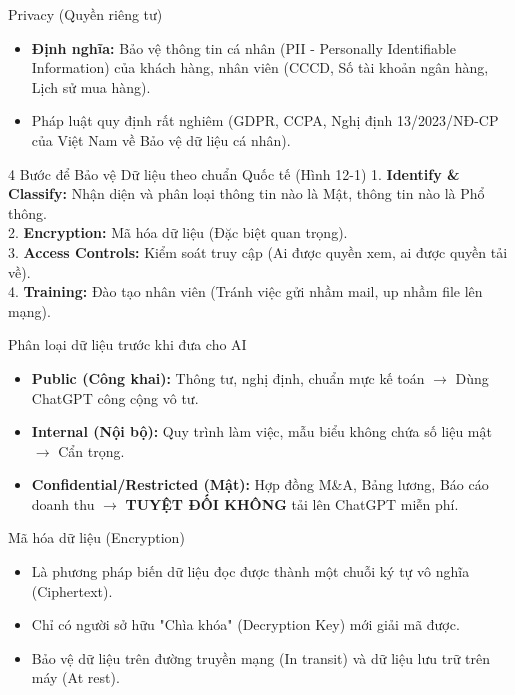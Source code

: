 \documentclass[aspectratio=169]{beamer}
\begin{document}
\begin{frame}{Privacy (Quyền riêng tư)}
    \begin{itemize}
        \item \textbf{Định nghĩa:} Bảo vệ thông tin cá nhân (PII - Personally Identifiable Information) của khách hàng, nhân viên (CCCD, Số tài khoản ngân hàng, Lịch sử mua hàng).
        \item Pháp luật quy định rất nghiêm (GDPR, CCPA, Nghị định 13/2023/NĐ-CP của Việt Nam về Bảo vệ dữ liệu cá nhân).
    \end{itemize}
\end{frame}


\begin{frame}{4 Bước để Bảo vệ Dữ liệu theo chuẩn Quốc tế (Hình 12-1)}
    1. \textbf{Identify \& Classify:} Nhận diện và phân loại thông tin nào là Mật, thông tin nào là Phổ thông.\\
    2. \textbf{Encryption:} Mã hóa dữ liệu (Đặc biệt quan trọng).\\
    3. \textbf{Access Controls:} Kiểm soát truy cập (Ai được quyền xem, ai được quyền tải về).\\
    4. \textbf{Training:} Đào tạo nhân viên (Tránh việc gửi nhầm mail, up nhầm file lên mạng).\\
\end{frame}


\begin{frame}{Phân loại dữ liệu trước khi đưa cho AI}
    \begin{itemize}
        \item \textbf{Public (Công khai):} Thông tư, nghị định, chuẩn mực kế toán $\rightarrow$ Dùng ChatGPT công cộng vô tư.
        \item \textbf{Internal (Nội bộ):} Quy trình làm việc, mẫu biểu không chứa số liệu mật $\rightarrow$ Cẩn trọng.
        \item \textbf{Confidential/Restricted (Mật):} Hợp đồng M\&A, Bảng lương, Báo cáo doanh thu $\rightarrow$ \textbf{TUYỆT ĐỐI KHÔNG} tải lên ChatGPT miễn phí.
    \end{itemize}
\end{frame}


\begin{frame}{Mã hóa dữ liệu (Encryption)}
    \begin{itemize}
        \item Là phương pháp biến dữ liệu đọc được thành một chuỗi ký tự vô nghĩa (Ciphertext).
        \item Chỉ có người sở hữu "Chìa khóa" (Decryption Key) mới giải mã được.
        \item Bảo vệ dữ liệu trên đường truyền mạng (In transit) và dữ liệu lưu trữ trên máy (At rest).
    \end{itemize}
\end{frame}
\end{document}
